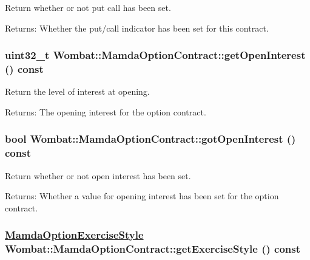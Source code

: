 Return whether or not put call has been set. 

\begin{Desc}
\item[Returns:]Whether the put/call indicator has been set for this contract. \end{Desc}
\hypertarget{classWombat_1_1MamdaOptionContract_e859d329f94a7eab79a34f1db4fe5731}{
\subsubsection[getOpenInterest]{\setlength{\rightskip}{0pt plus 5cm}uint32\_\-t Wombat::Mamda\-Option\-Contract::get\-Open\-Interest () const}}
\label{classWombat_1_1MamdaOptionContract_e859d329f94a7eab79a34f1db4fe5731}


Return the level of interest at opening. 

\begin{Desc}
\item[Returns:]The opening interest for the option contract. \end{Desc}
\hypertarget{classWombat_1_1MamdaOptionContract_15dd69320c1c03982c44b339e806d0ad}{
\subsubsection[gotOpenInterest]{\setlength{\rightskip}{0pt plus 5cm}bool Wombat::Mamda\-Option\-Contract::got\-Open\-Interest () const}}
\label{classWombat_1_1MamdaOptionContract_15dd69320c1c03982c44b339e806d0ad}


Return whether or not open interest has been set. 

\begin{Desc}
\item[Returns:]Whether a value for opening interest has been set for the option contract. \end{Desc}
\hypertarget{classWombat_1_1MamdaOptionContract_5273af6a0f17a001ce2ea6e80621ae39}{
\subsubsection[getExerciseStyle]{\setlength{\rightskip}{0pt plus 5cm}\hyperlink{namespaceWombat_e7be5722df9d72164d322f2b72cf8d1a}{Mamda\-Option\-Exercise\-Style} Wombat::Mamda\-Option\-Contract::get\-Exercise\-Style () const}}
\label{classWombat_1_1MamdaOptionContract_5273af6a0f17a001ce2ea6e80621ae39}


